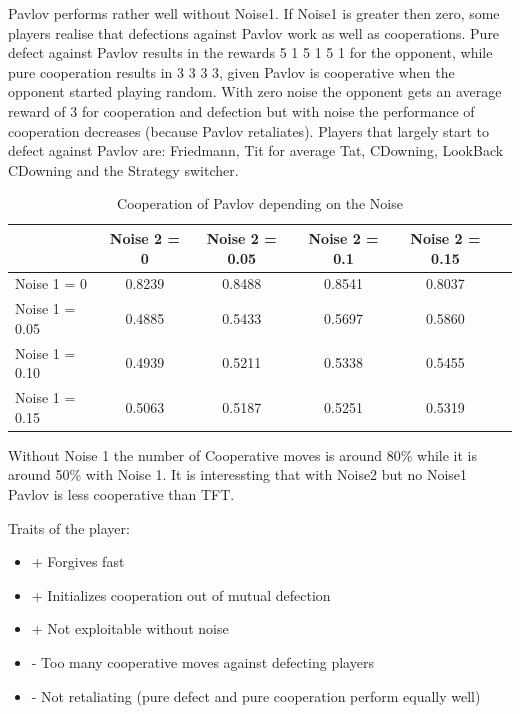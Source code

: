 \documentclass[11pt,twoside]{article}
\begin{document}
Pavlov performs rather well without Noise1. If Noise1 is greater then zero, some players realise that defections against Pavlov work as well as cooperations. Pure defect against Pavlov results in the rewards 5 1 5 1 5 1 for the opponent, while pure cooperation results in 3 3 3 3, given Pavlov is cooperative when the opponent started playing random. With zero noise the opponent gets an average reward of 3 for cooperation and defection but with noise the performance of cooperation decreases (because Pavlov retaliates). Players that largely start to defect against Pavlov are:  Friedmann, Tit for average Tat, CDowning, LookBack CDowning and the Strategy switcher.

\begin{table}[h]
 \begin{center}
\caption{Cooperation of Pavlov depending on the Noise} \vspace{3mm}
\begin{tabular}{|l|c|c|c|c|c|}
\hline
   	& Noise 2 = 0 & Noise 2 = 0.05& Noise 2 = 0.1& Noise 2 = 0.15 \\
  \hline
  Noise 1 = 0 	&     0.8239 &   0.8488&    0.8541&    0.8037 \\
 \hline
  Noise 1 = 0.05	 &   0.4885  &  0.5433 &   0.5697  &  0.5860 \\
 \hline
  Noise 1 = 0.10 	& 0.4939  &  0.5211 &   0.5338 &   0.5455 \\
 \hline
  Noise 1 = 0.15 	& 0.5063    &0.5187  &  0.5251 &   0.5319 \\
 \hline
\end{tabular}
 \end{center}
\end{table}

Without Noise 1 the number of Cooperative moves is around 80\% while it is around 50\% with Noise 1. It is interessting that with Noise2 but no Noise1 Pavlov is less cooperative than TFT.


Traits of the player:

\renewcommand{\labelitemi}{}
\begin{itemize}
	\item + Forgives fast
	\item + Initializes cooperation out of mutual defection
	\item + Not exploitable without noise
	\item - Too many cooperative moves against defecting players
	\item - Not retaliating (pure defect and pure cooperation perform equally well)
\end{itemize}
\renewcommand{\labelitemi}{$\bullet$}
\end{document}
